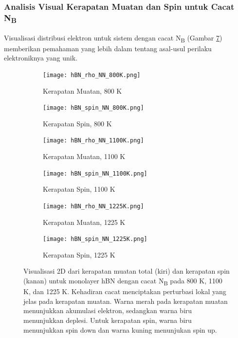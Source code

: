 \subsubsection{Analisis Visual Kerapatan Muatan dan Spin untuk Cacat N\textsubscript{B}}
\label{subsec:hbn_NN_density_analysis}
Visualisasi distribusi elektron untuk sistem dengan cacat N\textsubscript{B} (Gambar \ref{fig:hbn_NN_density}) memberikan pemahaman yang lebih dalam tentang asal-usul perilaku elektroniknya yang unik.
\begin{figure}[htbp!] %
  \centering
  \begin{subfigure}[b]{0.49\textwidth}
    \centering
    \texttt{[image: hBN\_rho\_NN\_800K.png]}
    \caption{Kerapatan Muatan, 800 K}
    \label{subfig:rho_nn_800k}
  \end{subfigure}\hfill
  \begin{subfigure}[b]{0.49\textwidth}
    \centering
    \texttt{[image: hBN\_spin\_NN\_800K.png]}
    \caption{Kerapatan Spin, 800 K}
    \label{subfig:spin_nn_800k}
  \end{subfigure}
  \vspace{1em}

  \begin{subfigure}[b]{0.49\textwidth}
    \centering
    \texttt{[image: hBN\_rho\_NN\_1100K.png]}
    \caption{Kerapatan Muatan, 1100 K}
    \label{subfig:rho_nn_1100k}
  \end{subfigure}\hfill
  \begin{subfigure}[b]{0.49\textwidth}
    \centering
    \texttt{[image: hBN\_spin\_NN\_1100K.png]}
    \caption{Kerapatan Spin, 1100 K}
    \label{subfig:spin_nn_1100k}
  \end{subfigure}
  \vspace{1em}

  \begin{subfigure}[b]{0.49\textwidth}
    \centering
    \texttt{[image: hBN\_rho\_NN\_1225K.png]}
    \caption{Kerapatan Muatan, 1225 K}
    \label{subfig:rho_nn_1225k}
  \end{subfigure}\hfill
  \begin{subfigure}[b]{0.49\textwidth}
    \centering
    \texttt{[image: hBN\_spin\_NN\_1225K.png]}
    \caption{Kerapatan Spin, 1225 K}
    \label{subfig:spin_nn_1225k}
  \end{subfigure}
  \caption{Visualisasi 2D dari kerapatan muatan total (kiri) dan kerapatan spin (kanan) untuk monolayer hBN dengan cacat N\textsubscript{B} pada 800 K, 1100 K, dan 1225 K. Kehadiran cacat menciptakan perturbasi lokal yang jelas pada kerapatan muatan. Warna merah pada kerapatan muatan menunjukkan akumulasi elektron, sedangkan warna biru menunjukkan deplesi. Untuk kerapatan spin, warna biru menunjukkan spin down dan warna kuning menunjukan spin up.}
  \label{fig:hbn_NN_density}
\end{figure}

